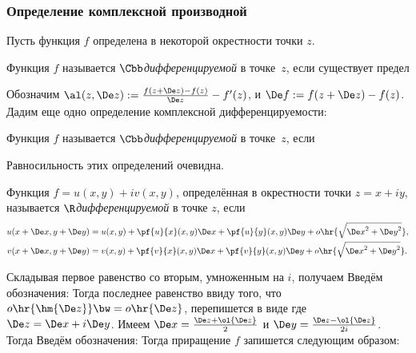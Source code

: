 \documentclass[a4paper]{article}
\begin{document}
\subsubsection{Определение комплексной производной}

Пусть функция $f$ определена в некоторой окрестности точки $z$.

\begin{df}
Функция $f$ называется \emph{$\Cbb$\д дифференцируемой} в точке~$z$, если существует предел
\end{df}

Обозначим $\al(z, \De z) := \frac{f(z + \De z) - f(z)}{\De z} - f'(z)$, и $\De f := f(z+\De z)-f(z)$.
Дадим еще одно определение комплексной дифференцируемости:

\begin{df}
Функция $f$ называется \emph{$\Cbb$\д дифференцируемой} в точке~$z$, если
\end{df}

Равносильность этих определений очевидна.

\begin{df}
Функция $f=u(x,y)+iv(x,y)$, определённая в окрестности точки $z=x+iy$,
называется \emph{$\R$\д дифференцируемой} в точке $z$, если
\begin{align*}
u(x+\De x, y+\De y)&=u(x,y)+\pf{u}{x}(x,y)\De x + \pf{u}{y}(x,y)\De y + o\hr{\sqrt{{\De x}^{2} + {\De y}^2}}, \\
v(x+\De x, y+\De y)&=v(x,y)+\pf{v}{x}(x,y)\De x + \pf{v}{y}(x,y)\De y + o\hr{\sqrt{{\De x}^{2} + {\De y}^2}}.
\end{align*}
\end{df}

Складывая первое равенство со вторым, умноженным на $i$, получаем
Введём обозначения:
Тогда последнее равенство ввиду того, что $o\hr{\hm{\De z}} \bw= o\hr{\De z}$, перепишется в виде
 где $\De z = \De x + i \De y$. Имеем
$\De x = \frac{\De z + \ol{\De z}}{2}$ и $\De y = \frac{\De z - \ol{\De z}}{2i}$. Тогда
Введём обозначения:
Тогда приращение $f$ запишется следующим образом:
\end{document}
